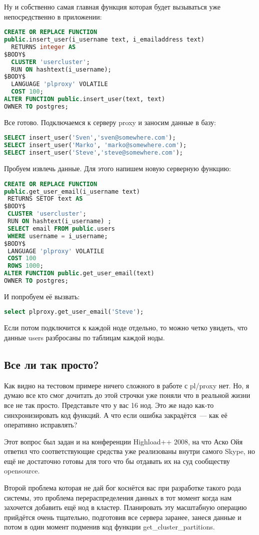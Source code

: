 Ну и собственно самая главная функция которая будет вызываться уже непосредственно в приложении:
\begin{lstlisting}[language=SQL,label=lst:plproxy10,caption=Настройка]
CREATE OR REPLACE FUNCTION 
public.insert_user(i_username text, i_emailaddress text)
  RETURNS integer AS
$BODY$
  CLUSTER 'usercluster';
  RUN ON hashtext(i_username);
$BODY$
  LANGUAGE 'plproxy' VOLATILE
  COST 100;
ALTER FUNCTION public.insert_user(text, text) 
OWNER TO postgres;
\end{lstlisting}

Все готово. Подключаемся к серверу proxy и заносим данные в базу:
\begin{lstlisting}[language=SQL,label=lst:plproxy11,caption=Настройка]
SELECT insert_user('Sven','sven@somewhere.com');
SELECT insert_user('Marko', 'marko@somewhere.com');
SELECT insert_user('Steve','steve@somewhere.com');
\end{lstlisting}

Пробуем извлечь данные.
Для этого напишем новую серверную функцию: 
\begin{lstlisting}[language=SQL,label=lst:plproxy12,caption=Настройка]
CREATE OR REPLACE FUNCTION 
public.get_user_email(i_username text)
 RETURNS SETOF text AS
$BODY$
 CLUSTER 'usercluster';
 RUN ON hashtext(i_username) ;
 SELECT email FROM public.users 
 WHERE username = i_username;
$BODY$
 LANGUAGE 'plproxy' VOLATILE
 COST 100
 ROWS 1000;
ALTER FUNCTION public.get_user_email(text) 
OWNER TO postgres;
\end{lstlisting}

И попробуем её вызвать:
\begin{lstlisting}[language=SQL,label=lst:plproxy13,caption=Настройка]
select plproxy.get_user_email('Steve');
\end{lstlisting}

Если потом подключится к каждой ноде отдельно, то можно четко увидеть, что данные users разбросаны по таблицам каждой ноды.

\subsection{Все ли так просто?}
Как видно на тестовом примере ничего сложного в работе с pl/proxy нет. 
Но, я думаю все кто смог дочитать до этой строчки уже поняли что в реальной жизни все не так просто.
Представьте что у вас 16 нод. Это же надо как-то синхронизировать код функций. А что если ошибка закрадётся~--- 
как её оперативно исправлять?

Этот вопрос был задан и на конференции Highload++ 2008, на что Аско Ойя ответил что соответствующие средства 
уже реализованы внутри самого Skype, но ещё не достаточно готовы для того что бы отдавать их на суд сообществу opensource.

Второй проблема которая не дай бог коснётся вас при разработке такого рода системы, это проблема перераспределения данных 
в тот момент когда нам захочется добавить ещё нод в кластер.
Планировать эту масштабную операцию прийдётся очень тщательно, подготовив все сервера заранее, 
занеся данные и потом в один момент подменив код функции get\_cluster\_partitions.
